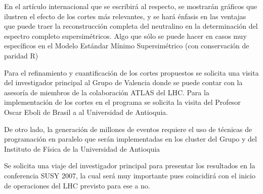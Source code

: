 \begin{ideas}
En el artículo internacional que se escribirá al respecto, se
mostrarán gráficos que ilustren el efecto de los cortes más
relevantes, y se hará énfasis en las ventajas que puede traer la
reconstrucción completa del neutralino en la determinación del
espectro completo supersimétricos. Algo que sólo se puede hacer en
casos muy específicos en el Modelo Estándar Mínimo Supersimétrico
(con conservación de paridad R)

Para el refinamiento y cuantificación de los cortes propuestos se
solicita una visita del investigador principal al Grupo de Valencia
donde se puede contar con la asesoría de miembros de la colaboración
ATLAS del LHC.  Para la implementación de los cortes en el programa se
solicita la visita del Profesor Oscar Eboli de Brasil a al Universidad
de Antioquia.

De otro lado, la generación de millones de eventos requiere el uso de
técnicas de programación en paralelo que serán implementadas en los
cluster del Grupo y del Instituto de Física de la Universidad de
Antioquia

Se solicita una viaje del investigador principal para presentar los
resultados en la conferencia SUSY 2007, la cual será muy importante
pues coincidirá con el inicio de operaciones del LHC previsto para ese
a no.


\end{ideas}

